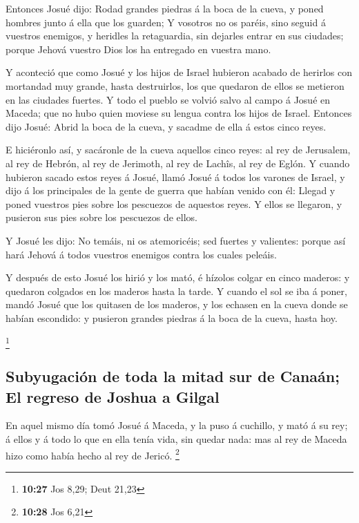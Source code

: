  Entonces Josué dijo: Rodad grandes piedras á la boca de
la cueva, y poned hombres junto á ella que los guarden; 
Y vosotros no os paréis, sino seguid á vuestros enemigos, y heridles la
retaguardia, sin dejarles entrar en sus ciudades; porque Jehová vuestro
Dios los ha entregado en vuestra mano.

 Y aconteció que como Josué y los hijos de Israel
hubieron acabado de herirlos con mortandad muy grande, hasta
destruirlos, los que quedaron de ellos se metieron en las ciudades
fuertes.  Y todo el pueblo se volvió salvo al campo á
Josué en Maceda; que no hubo quien moviese su lengua contra los hijos de
Israel.  Entonces dijo Josué: Abrid la boca de la cueva,
y sacadme de ella á estos cinco reyes.

 E hiciéronlo así, y sacáronle de la cueva aquellos cinco
reyes: al rey de Jerusalem, al rey de Hebrón, al rey de Jerimoth, al rey
de Lachîs, al rey de Eglón.  Y cuando hubieron sacado
estos reyes á Josué, llamó Josué á todos los varones de Israel, y dijo á
los principales de la gente de guerra que habían venido con él: Llegad y
poned vuestros pies sobre los pescuezos de aquestos reyes. Y ellos se
llegaron, y pusieron sus pies sobre los pescuezos de ellos.

 Y Josué les dijo: No temáis, ni os atemoricéis; sed
fuertes y valientes: porque así hará Jehová á todos vuestros enemigos
contra los cuales peleáis.

 Y después de esto Josué los hirió y los mató, é hízolos
colgar en cinco maderos: y quedaron colgados en los maderos hasta la
tarde.  Y cuando el sol se iba á poner, mandó Josué que
los quitasen de los maderos, y los echasen en la cueva donde se habían
escondido: y pusieron grandes piedras á la boca de la cueva, hasta hoy.

\footnote{\textbf{10:27} Jos 8,29; Deut 21,23}

\hypertarget{subyugaciuxf3n-de-toda-la-mitad-sur-de-canauxe1n-el-regreso-de-joshua-a-gilgal}{%
\subsection{Subyugación de toda la mitad sur de Canaán; El regreso de
Joshua a
Gilgal}\label{subyugaciuxf3n-de-toda-la-mitad-sur-de-canauxe1n-el-regreso-de-joshua-a-gilgal}}

 En aquel mismo día tomó Josué á Maceda, y la puso á
cuchillo, y mató á su rey; á ellos y á todo lo que en ella tenía vida,
sin quedar nada: mas al rey de Maceda hizo como había hecho al rey de
Jericó. \footnote{\textbf{10:28} Jos 6,21}

